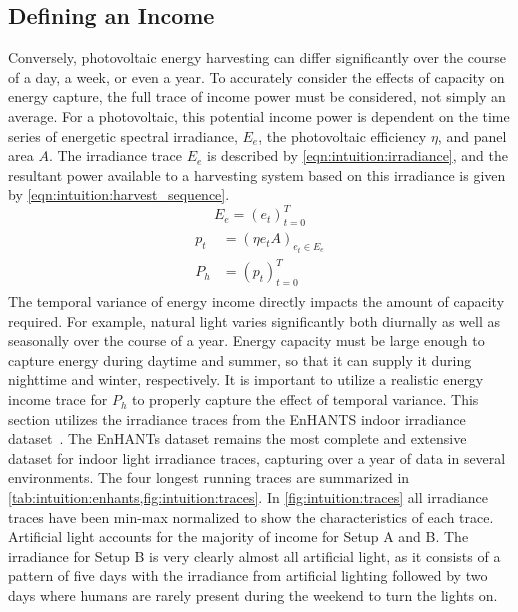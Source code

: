 \subsection{Defining an Income}
Conversely, photovoltaic energy harvesting can differ significantly over the course of a day, a week, or even a year. 
To accurately consider the effects of capacity on energy capture, the full trace of income power must be considered, not simply an average.
For a photovoltaic, this potential income power is dependent on the time series of energetic spectral irradiance, $E_e$, the photovoltaic efficiency $\eta$, and panel area $A$.
The irradiance trace $E_e$ is described by \cref{eqn:intuition:irradiance}, and the resultant power available to a harvesting system based on this irradiance is given by \cref{eqn:intuition:harvest_sequence}.
\begin{equation}
    \label{eqn:intuition:irradiance}
    E_e = (e_t) ^ {T}_{t=0}
\end{equation}
\begin{align} 
    \begin{split}
    p_t & = (\eta e_{t} A)_{e_t \in E_e}\\
    P_{h} &= (p_t) ^T _{t=0}
    \end{split}
    \label{eqn:intuition:harvest_sequence}
\end{align}
The temporal variance of energy income directly impacts the amount of capacity required. 
For example, natural light varies significantly both diurnally as well as seasonally over the course of a year.
Energy capacity must be large enough to capture energy during daytime and summer, so that it can supply it during nighttime and winter, respectively. 
It is important to utilize a realistic energy income trace for $P_h$ to properly capture the effect of temporal variance.
This section utilizes the irradiance traces from the EnHANTS indoor irradiance dataset~\cite{gorlatova2013networking}.
The EnHANTs dataset remains the most complete and extensive dataset for indoor light
irradiance traces, capturing over a year of data in several environments.
The four longest running traces are summarized in \cref{tab:intuition:enhants,fig:intuition:traces}.
In \cref{fig:intuition:traces} all irradiance traces have been min-max normalized to show the characteristics of each trace.
Artificial light accounts for the majority of income for Setup A and B.
The irradiance for Setup B is very clearly almost all artificial light, as it consists of a pattern of five days with the irradiance from artificial lighting followed by two days where humans are rarely present during the weekend to turn the lights on. 
